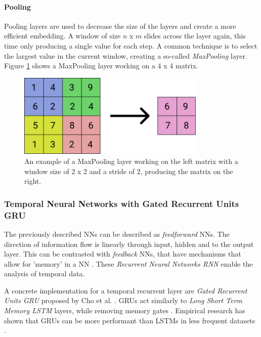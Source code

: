 \paragraph{Pooling}
Pooling layers are used to decrease the size of the layers and create a more efficient embedding. A window of size $n$ x $m$ slides across the layer again, this time only producing a single value for each step. A common technique is to select the largest value in the current window, creating a so-called \emph{MaxPooling} layer. Figure \ref{fig:pooling} shows a MaxPooling layer working on a 4 x 4 matrix.

\begin{figure}
    \centering
    \includegraphics[width=0.8\textwidth]{res/png_backup/pool.png}
    \caption{An example of a MaxPooling layer working on the left matrix with a window size of 2 x 2 and a stride of 2, producing the matrix on the right.}
    \label{fig:pooling}
\end{figure}

\subsubsection{Temporal Neural Networks with Gated Recurrent Units GRU}
The previously described NNs can be described as \emph{feedforward} NNs. The direction of information flow is linearly through input, hidden and to the output layer. This can be contrasted with \emph{feedback} NNs, that have mechanisms that allow for 'memory' in a NN \cite{wang2003artificial}. These \emph{Recurrent Neural Networks RNN} enable the analysis of temporal data.

A concrete implementation for a temporal recurrent layer are \emph{Gated Recurrent Units GRU} proposed by Cho et al. \cite{cho2014properties} \cite{chung2014empirical}. GRUs act similarly to \emph{Long Short Term Memory LSTM} \cite{hochreiter1997lstm} layers, while removing memory gates \cite{chung2014empirical}. Empirical research has shown that GRUs can be more performant than LSTMs in less frequent datasets \cite{gruber2020gru}.


